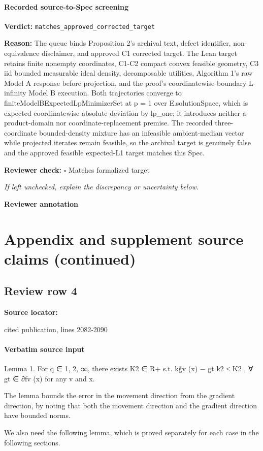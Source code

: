 \documentclass[10pt]{article}
\newcommand{\reviewerbox}{%
  \par\noindent\fbox{\parbox{0.96\linewidth}{\rule{0pt}{0.38in}}}\par
}
\newcommand{\reviewmatch}[1]{%
  \par\noindent\textbf{Reviewer check:} $\square$\; #1\par
  \noindent\emph{If left unchecked, explain the discrepancy or uncertainty below.}\par
}
\begin{document}
\paragraph{Recorded source-to-Spec screening}
\textbf{Verdict:} \texttt{matches\_approved\_corrected\_target}
\\
{\raggedright
\textbf{Reason:} The queue binds Proposition 2's archival text, defect identifier, non-\allowbreak{}equivalence disclaimer, and approved C1 corrected target.\allowbreak{} The Lean target retains finite nonempty coordinates, C1-\allowbreak{}C2 compact convex feasible geometry, C3 iid bounded measurable ideal density, decomposable utilities, Algorithm 1's raw Model A response before projection, and the proof's coordinatewise-\allowbreak{}boundary L-\allowbreak{}infinity Model B execution.\allowbreak{} Both trajectories converge to finiteModelBExpectedLpMinimizerSet at p = 1 over E.\allowbreak{}solutionSpace, which is expected coordinatewise absolute deviation by lp\_\allowbreak{}one;\allowbreak{} it introduces neither a product-\allowbreak{}domain nor coordinate-\allowbreak{}replacement premise.\allowbreak{} The recorded three-\allowbreak{}coordinate bounded-\allowbreak{}density mixture has an infeasible ambient-\allowbreak{}median vector while projected iterates remain feasible, so the archival target is genuinely false and the approved feasible expected-\allowbreak{}L1 target matches this Spec.\allowbreak{}
\par}
\reviewmatch{Matches formalized target}
\noindent\textbf{Reviewer annotation}\par
\reviewerbox
\clearpage
\hypertarget{source-claim-e10fc73b582f4351}{}
\hypertarget{source-section-ff6e74b6c8cd2005}{}
\section*{Appendix and supplement source claims (continued)}
\subsection*{Review row 4}
\textbf{Source locator:} {\footnotesize\raggedright cited publication, lines 2082-\allowbreak{}2090\par}
\paragraph{Verbatim source input}
\begin{ReviewVerbatim}
Lemma 1. For q ∈ {1, 2, ∞}, there exists K2 ∈ R+ s.t. kg̃v (x) − gt k2 ≤ K2 , ∀ gt ∈ ∂fv (x)
for any v and x.

The lemma bounds the error in the movement direction from the gradient direction, by
noting that both the movement direction and the gradient direction have bounded norms.


We also need the following lemma, which is proved separately for each case in the following
sections.
\end{ReviewVerbatim}
\end{document}
